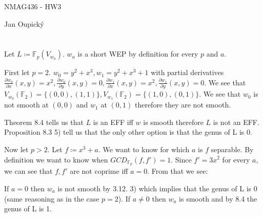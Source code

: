 \documentclass[12pt, a4paper]{article}
\begin{document}
\begin{center}
\large NMAG436 - HW3

\normalsize Jan Oupický
\end{center}
\vspace{1\baselineskip}

\section{}
Let $L \coloneqq \mathbb{F}_p(V_{w_a})$. $w_a$ is a short WEP by definition for every $p$ and $a$. 

First let $p=2$. $w_0 = y^2+x^3, w_1 = y^2 + x^3 + 1$ with partial derivatives $\frac{\partial w_0}{\partial x} (x,y) = x^2, \frac{\partial w_0}{\partial y} (x,y) = 0, \frac{\partial w_1}{\partial x} (x,y) = x^2, \frac{\partial w_1}{\partial y} (x,y) = 0$. We see that $V_{w_0}(\mathbb{F}_2) = \{(0,0), (1,1)\}, V_{w_1}(\mathbb{F}_2) = \{(1,0),(0,1)\}$. We see that $w_0$ is not smooth at $(0,0)$ and $w_1$ at $(0,1)$ therefore they are not smooth. 

Theorem 8.4 tells us that $L$ is an EFF iff $w$ is smooth therefore $L$ is not an EFF. Proposition 8.3 5) tell us that the only other option is that the genus of L is 0.

Now let $p>2$. Let $f \coloneqq x^3+a$. We want to know for which $a$ is $f$ separable. By definition we want to know when $GCD_{\mathbb{F}_p}(f,f')=1$. Since $f' = 3x^2$ for every $a$, we can see that $f,f'$ are not coprime iff $a = 0$. From that we see:


If $a=0$ then $w_a$ is not smooth by 3.12. 3) which implies that the genus of L is 0 (same reasoning as in the case $p=2$). If $a\neq 0$ then $w_a$ is smooth and by 8.4 the genus of L is 1. 
\end{document}
